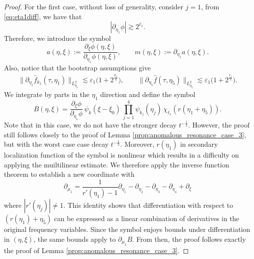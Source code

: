 \documentclass[reqno,english,11pt]{amsart}
\newcommand{\eps}{\varepsilon}
\theoremstyle{definition}
\numberwithin{equation}{section}
\begin{document}
\begin{proof}
For the first case, without loss of generality, consider $j=1$, from \eqref{eq:eta1diff}, we have that
\begin{equation*}
    |\partial_{\eta_1}\phi|\gtrsim 2^{\ell_1}. 
\end{equation*}
Therefore, we introduce the symbol
\begin{equation}\label{eqn:def_a_symbol_case_4}
a(\eta,\xi)
:=\frac{\partial_\xi\phi(\eta,\xi)}{\partial_{\eta_1}\phi(\eta,\xi)},\qquad
m(\eta,\xi)
:=\partial_{\eta_1} a(\eta,\xi).
\end{equation}
Also, notice that the bootstrap assumptions give
\begin{subequations}\label{eq:derivative_bootstrap_assump_case_1}
\begin{align}
\big\|\partial_{\eta_1}\widehat f_{k_1}(\tau,\eta_1)\big\|_{L^2_{\eta_1}}
\lesssim \eps_1\Big(1 + 2^{\frac{k_1}{2}}\Big),\qquad\big\|\partial_{\eta_5}\widehat f(\tau,\eta_5)\big\|_{L^2_{\eta_5}}
\lesssim \eps_1\Big(1+ 2^{\frac{\ell_1}{2}}\Big).
\end{align}
\end{subequations}
We integrate by parts in the $\eta_1$ direction and define the symbol
\begin{equation}\label{eq:symbol_subcase4-1}
    B(\eta,\xi)=\frac{\partial_\xi\phi}{\partial_{\eta_1}\phi}\,\psi_k(\xi-\xi_0)\,\prod^{4}_{j=1}\psi_{k_j}(\eta_j)\,\chi_{\ell_1}\left(r(\eta_1+\eta_5)\right).
\end{equation}
Note that in this case, we do not have the stronger decay $t^{-\frac{1}{2}}$. However, the proof still follows closely to the proof of Lemma \ref{prop:anomalous_resonance_case_3}, but with the worst case case decay $t^{-\frac{1}{3}}$. Moreover, $r(\eta_1)$ in secondary localization function of the symbol is nonlinear which results in a difficulty on applying the muiltilinear estimate. We therefore apply the inverse function theorem to establish a new coordinate with 
$$\partial_{\mu_1}= \frac{1}{r'(\eta_1)-1}\partial_{\eta_1} - \partial_{\eta_2} - \partial_{\eta_3}-\partial_{\eta_4} +\partial_{\xi}$$
where $|r'(\eta_j)| \neq 1$. This identity shows that differentiation with respect to $\left(r(\eta_1)+\eta_5\right)$ can be expressed as a linear combination of derivatives in the original frequency variables. Since the symbol enjoys bounds under differentiation in $(\eta,\xi)$, the same bounds apply to $\partial_{\mu_1} B$. From then, the proof follows exactly the proof of Lemma \ref{prop:anomalous_resonance_case_3}.


\end{proof}
\end{document}
